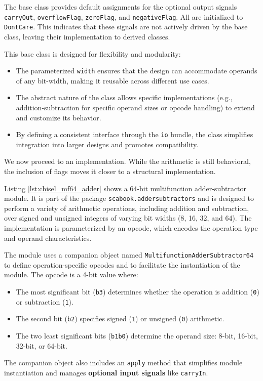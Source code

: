 {The base class provides default assignments for the optional output signals \texttt{carryOut}, \texttt{overflowFlag}, \texttt{zeroFlag}, and \texttt{negativeFlag}. All are initialized to \texttt{DontCare}. This indicates that these signals are not actively driven by the base class, leaving their implementation to derived classes.

This base class is designed for flexibility and modularity:
\begin{itemize}
    \item The parameterized \texttt{width} ensures that the design can accommodate operands of any bit-width, making it reusable across different use cases.
    \item The abstract nature of the class allows specific implementations (e.g., addition-subtraction for specific operand sizes or opcode handling) to extend and customize its behavior.
    \item By defining a consistent interface through the \texttt{io} bundle, the class simplifies integration into larger designs and promotes compatibility.
\end{itemize}

We now proceed to an implementation. While the arithmetic is still behavioral, the inclusion of flags moves it closer to a structural implementation.


Listing \ref{lst:chisel_mf64_adder} shows a 64-bit multifunction adder-subtractor module. It is part of the package \texttt{scabook.addersubtractors} and is designed to perform a variety of arithmetic operations, including addition and subtraction, over signed and unsigned integers of varying bit widths (8, 16, 32, and 64). The implementation is parameterized by an opcode, which encodes the operation type and operand characteristics. 

The module uses a companion object named \texttt{MultifunctionAdderSubtractor64} to define operation-specific opcodes and to facilitate the instantiation of the module. The opcode is a 4-bit value where:
\begin{itemize}
    \item The most significant bit (\texttt{b3}) determines whether the operation is addition (\texttt{0}) or subtraction (\texttt{1}).
    \item The second bit (\texttt{b2}) specifies signed (\texttt{1}) or unsigned (\texttt{0}) arithmetic.
    \item The two least significant bits (\texttt{b1b0}) determine the operand size: 8-bit, 16-bit, 32-bit, or 64-bit.
\end{itemize}
The companion object also includes an \texttt{apply} method that simplifies module instantiation and manages \textbf{optional input signals} like \texttt{carryIn}.

}
